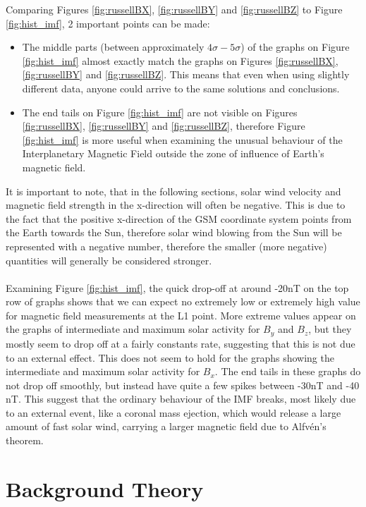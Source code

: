 \documentclass[11pt]{article}
\begin{document}
        Comparing Figures \ref{fig:russellBX}, \ref{fig:russellBY} and \ref{fig:russellBZ} to Figure \ref{fig:hist_imf}, 2 important points can be made:
        \begin{itemize}
            \item The middle parts (between approximately $4\sigma -5\sigma$) of the graphs on Figure \ref{fig:hist_imf} almost exactly match the graphs on Figures \ref{fig:russellBX}, \ref{fig:russellBY} and \ref{fig:russellBZ}. This means that even when using slightly different data, anyone could arrive to the same solutions and conclusions.
            \item The end tails on Figure \ref{fig:hist_imf} are not visible on Figures \ref{fig:russellBX}, \ref{fig:russellBY} and \ref{fig:russellBZ}, therefore Figure \ref{fig:hist_imf} is more useful when examining the unusual behaviour of the Interplanetary Magnetic Field outside the zone of influence of Earth's magnetic field.
        \end{itemize}
        It is important to note, that in the following sections, solar wind velocity and magnetic field strength in the x-direction will often be negative. This is due to the fact that the positive x-direction of the GSM coordinate system points from the Earth towards the Sun, therefore solar wind blowing from the Sun will be represented with a negative number, therefore the smaller (more negative) quantities will generally be considered stronger.\\ \\
        Examining Figure \ref{fig:hist_imf}, the quick drop-off at around -20nT on the top row of graphs shows that we can expect no extremely low or extremely high value for magnetic field measurements at the L1 point. More extreme values appear on the graphs of intermediate and maximum solar activity for $B_y$ and $B_z$, but they mostly seem to drop off at a fairly constants rate, suggesting that this is not due to an external effect. This does not seem to hold for the graphs showing the intermediate and maximum solar activity for $B_x$. The end tails in these graphs do not drop off smoothly, but instead have quite a few spikes between -30nT and -40 nT. This suggest that the ordinary behaviour of the IMF breaks, most likely due to an external event, like a coronal mass ejection, which would release a large amount of fast solar wind, carrying a larger magnetic field due to Alfvén's theorem\cite{1976alfven}.
\section{Background Theory}\label{sec:theory}
\end{document}
